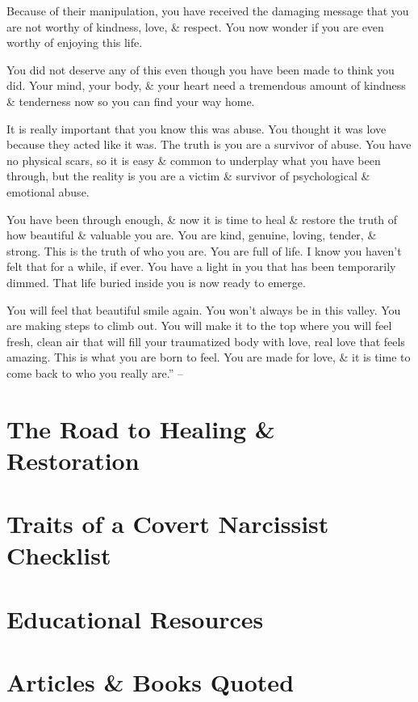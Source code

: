 \documentclass{article}
\numberwithin{equation}{section}
\begin{document}
Because of their manipulation, you have received the damaging message that you are not worthy of kindness, love, \& respect. You now wonder if you are even worthy of enjoying this life.

You did not deserve any of this even though you have been made to think you did. Your mind, your body, \& your heart need a tremendous amount of kindness \& tenderness now so you can find your way home.

It is really important that you know this was abuse. You thought it was love because they acted like it was. The truth is you are a survivor of abuse. You have no physical scars, so it is easy \& common to underplay what you have been through, but the reality is you are a victim \& survivor of psychological \& emotional abuse.

You have been through enough, \& now it is time to heal \& restore the truth of how beautiful \& valuable you are. You are kind, genuine, loving, tender, \& strong. This is the truth of who you are. You are full of life. I know you haven't felt that for a while, if ever. You have a light in you that has been temporarily dimmed. That life buried inside you is now ready to emerge.

You will feel that beautiful smile again. You won't always be in this valley. You are making steps to climb out. You will make it to the top where you will feel fresh, clean air that will fill your traumatized body with love, real love that feels amazing. This is what you are born to feel. You are made for love, \& it is time to come back to who you really are.'' -- \cite[pp. 145--148]{Mirza2017}


\section{The Road to Healing \& Restoration}


\section{Traits of a Covert Narcissist Checklist}


\section{Educational Resources}


\section{Articles \& Books Quoted}


\printbibliography[heading=bibintoc]
	
\end{document}
